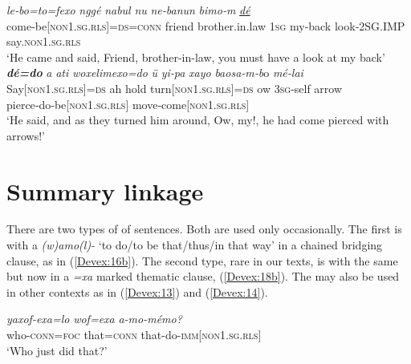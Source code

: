 \documentclass[output=paper]{LSP/langsci}
\begin{document}
\begin{exe}
\ex \label{Devex:12ab}
\begin{xlist}
\ex \label{Devex:12a}		
\gll \textit{le‑bo=to=fexo} \textit{nggé} \textit{nabul} \textit{nu} \textit{ne‑banun} \textit{bimo‑m} \underline{\textit{dé}}\\
come‑be[\textsc{non1.sg.rls}]=\textsc{ds}=\textsc{conn} friend brother.in.law \textsc{1sg} my‑back look‑\textsc{2SG.IMP} say.\textsc{non1.sg.rls} \\
\glt `He came and said, Friend, brother-in-law, you must have a look at my back'\\

\ex \label{Devex:12b}		
\gll \textbf{\textit{dé=do}} \textit{a} \textit{ati} \textit{woxelimexo=do} \textit{ü} \textit{yi‑pa} \textit{xayo} \textit{baosa‑m‑b}o \textit{mé‑lai}\\          
Say[\textsc{non1.sg.rls}]=\textsc{ds} ah hold turn[\textsc{non1.sg.rls}]=\textsc{ds} ow \textsc{3sg}‑self  	arrow pierce‑do‑be[\textsc{non1.sg.rls}] move‑come[\textsc{non1.sg.rls}]\\
\glt `He said, and as they turned him around, Ow, my!, he had come pierced with arrows!'\\
\end{xlist}
\end{exe}

	
\section{Summary linkage} 
\label{Devsumm.link}
There are two types of  of sentences. Both are used only occasionally. The first is with a  \textit{(w)amo(l)-} `to do/to be that/thus/in that way' in a chained bridging clause, as in (\ref{Devex:16b}). The second type, rare in our texts, is with the same  but now in a \textit{=xa} marked thematic clause, (\ref{Devex:18b}). The  may also be used in other contexts as in (\ref{Devex:13}) and (\ref{Devex:14}).


\begin{exe}
\ex \label{Devex:13}
\gll \textit{yaxof-exa=lo} \textit{wof=exa} \textit{a-mo-mémo?}\\
who-\textsc{conn=foc} that=\textsc{conn} that-do-\textsc{imm[non1.sg.rls]}\\
\glt `Who just did that?'\\
\end{exe}
	     
\end{document}
